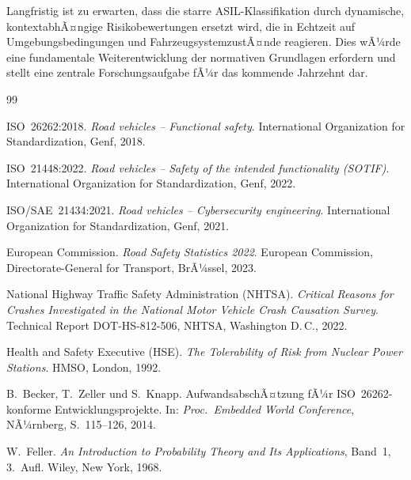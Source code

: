 ﻿\documentclass[a4paper,12pt]{article}
\theoremstyle{definition}
\begin{document}
Langfristig ist zu erwarten, dass die starre ASIL-Klassifikation
durch dynamische, kontextabhÃ¤ngige Risikobewertungen ersetzt wird,
die in Echtzeit auf Umgebungsbedingungen und FahrzeugsystemzustÃ¤nde
reagieren. Dies wÃ¼rde eine fundamentale Weiterentwicklung der
normativen Grundlagen erfordern und stellt eine zentrale
Forschungsaufgabe fÃ¼r das kommende Jahrzehnt dar.

\begin{thebibliography}{99}

ISO~26262:2018.
\newblock \textit{Road vehicles -- Functional safety}.
\newblock International Organization for Standardization,
  Genf, 2018.

ISO~21448:2022.
\newblock \textit{Road vehicles -- Safety of the intended
  functionality (SOTIF)}.
\newblock International Organization for Standardization,
  Genf, 2022.

ISO/SAE~21434:2021.
\newblock \textit{Road vehicles -- Cybersecurity engineering}.
\newblock International Organization for Standardization,
  Genf, 2021.

European Commission.
\newblock \textit{Road Safety Statistics 2022}.
\newblock European Commission, Directorate-General for Transport,
  BrÃ¼ssel, 2023.

National Highway Traffic Safety Administration (NHTSA).
\newblock \textit{Critical Reasons for Crashes Investigated in
  the National Motor Vehicle Crash Causation Survey}.
\newblock Technical Report DOT-HS-812-506, NHTSA,
  Washington D.\,C., 2022.

Health and Safety Executive (HSE).
\newblock \textit{The Tolerability of Risk from Nuclear Power
  Stations}.
\newblock HMSO, London, 1992.

B.~Becker, T.~Zeller und S.~Knapp.
\newblock AufwandsabschÃ¤tzung fÃ¼r ISO~26262-konforme
  Entwicklungsprojekte.
\newblock In: \textit{Proc.\ Embedded World Conference},
  NÃ¼rnberg, S.~115--126, 2014.

W.~Feller.
\newblock \textit{An Introduction to Probability Theory and Its
  Applications}, Band~1, 3.~Aufl.
\newblock Wiley, New York, 1968.


\end{thebibliography}
\end{document}
